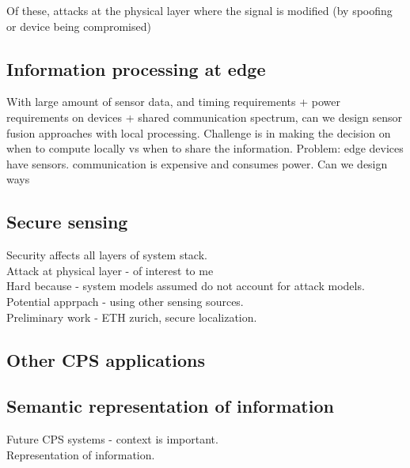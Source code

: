 \documentclass[10pt]{article}
\begin{document}
Of these, attacks at the physical layer where the signal is modified (by spoofing or device being compromised)



\subsection{Information processing at edge}
With large amount of sensor data, and timing requirements + power requirements on devices + shared communication spectrum, can we design sensor fusion approaches with local processing. Challenge is in making the decision on when to compute locally vs when to share the information. 
Problem: edge devices have sensors.
communication is expensive and consumes power. Can we design ways


\subsection{Secure sensing}
Security affects all layers of system stack.\\
Attack at physical layer  - of interest to me\\
Hard because - system models assumed do not account for attack models.\\
Potential apprpach - using other sensing sources.\\
Preliminary work - ETH zurich, secure localization.


\subsection{Other CPS applications}



\subsection{Semantic representation of information}
Future CPS systems - context is important. \\

Representation of information.





\newpage



\end{document}
